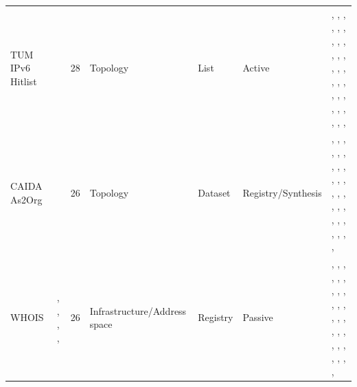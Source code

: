 \documentclass[11pt,a4paper]{article}
\begin{document}
\begin{longtable}{@{}p{}p{}p{}p{}p{}p{}p{}@{}}
TUM IPv6 Hitlist & \cite{gasser2016scanningipv6internetcomprehensive} & 28 & Topology & List & Active & \cite{10.1145/3730567.3764484}, \cite{10.1145/3646547.3688420}, \cite{10.1145/3646547.3688417}, \cite{10.1145/3646547.3688449}, \cite{10.1145/3646547.3689017}, \cite{10.1145/3517745.3561431}, \cite{10.1145/3517745.3561440}, \cite{10.1145/3487552.3487826}, \cite{10.1145/3487552.3487848}, \cite{10.1007/978-3-030-72582-2_32}, \cite{10.1007/978-3-030-98785-5_28}, \cite{10.1007/978-3-031-28486-1_2}, \cite{10.1007/978-3-031-56249-5_5}, \cite{10.1007/978-3-031-56252-5_13}, \cite{10.1007/978-3-031-85960-1_2}, \cite{10.1007/978-3-031-85960-1_3}, \cite{10.1145/3730567.3764502}, \cite{10.1007/978-3-031-56249-5_4}, \cite{10.1007/978-3-031-85960-1_16}, \cite{10.1145/3777912.3839826}, \cite{10.1007/978-3-032-18268-5_6}, \cite{10.1007/978-3-032-18268-5_10}, \cite{10.1145/3777912.3809157}, \cite{10.1145/3777912.3839803}, \cite{10.1145/3777912.3839828}, \cite{10.1145/3777912.3809144}, \cite{10.1145/3777912.3809137}, \cite{10.1145/3777912.3809139} \\
CAIDA As2Org & \cite{caidaas2org} & 26 & Topology & Dataset & Registry/Synthesis & \cite{10.1145/3730567.3732918}, \cite{10.1145/3730567.3764485}, \cite{10.1145/3730567.3732917}, \cite{10.1145/3646547.3689010}, \cite{10.1145/3618257.3624838}, \cite{10.1145/3618257.3624831}, \cite{10.1145/3618257.3624819}, \cite{10.1145/3517745.3561458}, \cite{10.1145/3517745.3561419}, \cite{10.1145/3517745.3561425}, \cite{10.1145/3487552.3487825}, \cite{10.1145/3487552.3487822}, \cite{10.1007/978-3-030-98785-5_14}, \cite{10.1007/978-3-030-98785-5_15}, \cite{10.1007/978-3-030-98785-5_29}, \cite{10.1007/978-3-031-28486-1_10}, \cite{10.1007/978-3-031-28486-1_15}, \cite{10.1007/978-3-031-28486-1_17}, \cite{10.1007/978-3-031-28486-1_23}, \cite{10.1007/978-3-031-85960-1_3}, \cite{10.1007/978-3-031-85960-1_9}, \cite{10.1007/978-3-032-18268-5_5}, \cite{10.1145/3777912.3839828}, \cite{10.1145/3777912.3809143}, \cite{10.1145/3777912.3809144}, \cite{10.1145/3777912.3839812} \\
WHOIS & \cite{arinwhois}, \cite{ripewhois}, \cite{afrinicwhois}, \cite{lacnicwhois}, \cite{apnicwhois} & 26 & Infrastructure/Address space & Registry & Passive & \cite{10.1145/3730567.3764491}, \cite{10.1145/3730567.3732918}, \cite{10.1145/3730567.3764485}, \cite{10.1145/3730567.3764452}, \cite{10.1145/3646547.3688410}, \cite{10.1145/3646547.3688441}, \cite{10.1145/3646547.3689010}, \cite{10.1145/3618257.3624805}, \cite{10.1145/3618257.3624802}, \cite{10.1145/3618257.3624803}, \cite{10.1145/3517745.3561440}, \cite{10.1145/3487552.3487822}, \cite{10.1007/978-3-030-72582-2_3}, \cite{10.1007/978-3-030-72582-2_4}, \cite{10.1007/978-3-030-72582-2_14}, \cite{10.1007/978-3-030-98785-5_6}, \cite{10.1007/978-3-031-28486-1_15}, \cite{10.1007/978-3-031-56249-5_9}, \cite{10.1007/978-3-031-56249-5_10}, \cite{10.1007/978-3-031-85960-1_9}, \cite{10.1145/3777912.3809135}, \cite{10.1145/3777912.3809155}, \cite{10.1007/978-3-032-18268-5_15}, \cite{10.1145/3777912.3839793}, \cite{10.1145/3777912.3839795}, \cite{10.1145/3777912.3809139} \\

\end{longtable}
\end{document}

